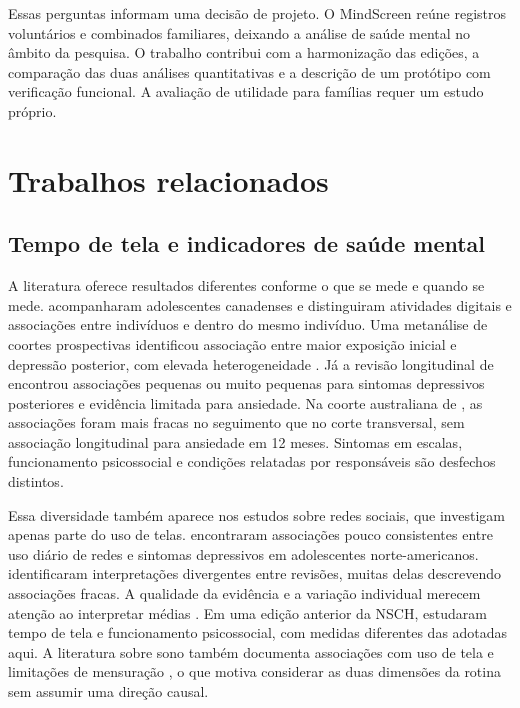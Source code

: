 ﻿\documentclass[12pt]{article}
\begin{document}
Essas perguntas informam uma decisão de projeto. O MindScreen reúne registros voluntários e combinados familiares, deixando a análise de saúde mental no âmbito da pesquisa. O trabalho contribui com a harmonização das edições, a comparação das duas análises quantitativas e a descrição de um protótipo com verificação funcional. A avaliação de utilidade para famílias requer um estudo próprio.

\section{Trabalhos relacionados}
\subsection{Tempo de tela e indicadores de saúde mental}
A literatura oferece resultados diferentes conforme o que se mede e quando se mede. \cite{boers2019} acompanharam adolescentes canadenses e distinguiram atividades digitais e associações entre indivíduos e dentro do mesmo indivíduo. Uma metanálise de coortes prospectivas identificou associação entre maior exposição inicial e depressão posterior, com elevada heterogeneidade \cite{gao2024}. Já a revisão longitudinal de \cite{tang2021} encontrou associações pequenas ou muito pequenas para sintomas depressivos posteriores e evidência limitada para ansiedade. Na coorte australiana de \cite{li2025}, as associações foram mais fracas no seguimento que no corte transversal, sem associação longitudinal para ansiedade em 12 meses. Sintomas em escalas, funcionamento psicossocial e condições relatadas por responsáveis são desfechos distintos.

Essa diversidade também aparece nos estudos sobre redes sociais, que investigam apenas parte do uso de telas. \cite{kreski2021} encontraram associações pouco consistentes entre uso diário de redes e sintomas depressivos em adolescentes norte-americanos. \cite{valkenburg2022} identificaram interpretações divergentes entre revisões, muitas delas descrevendo associações fracas. A qualidade da evidência e a variação individual merecem atenção ao interpretar médias \cite{stiglic2019,orben2020}. Em uma edição anterior da NSCH, \cite{przybylski2020} estudaram tempo de tela e funcionamento psicossocial, com medidas diferentes das adotadas aqui. A literatura sobre sono também documenta associações com uso de tela e limitações de mensuração \cite{hale2015}, o que motiva considerar as duas dimensões da rotina sem assumir uma direção causal.
\end{document}
